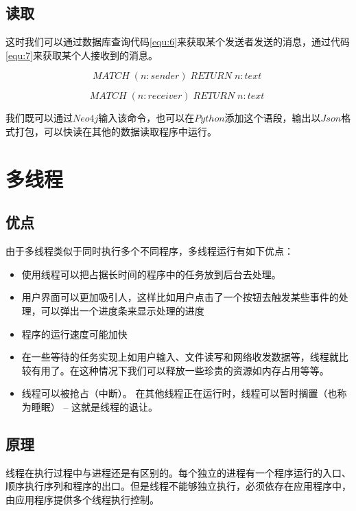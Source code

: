 \documentclass[forprint]{sql}
\begin{document}
\subsection{读取}
这时我们可以通过数据库查询代码\ref{equ:6}来获取某个发送者发送的消息，通过代码\ref{equ:7}来获取某个人接收到的消息。

\begin{equation}
	\label{equ:6}
	MATCH \; (n:sender) \; RETURN \; n:text \;
\end{equation}

\begin{equation}
	\label{equ:7}
	MATCH \; (n:receiver) \; RETURN \; n:text \;
\end{equation}

我们既可以通过$Neo4j$输入该命令，也可以在$Python$添加这个语段，输出以$Json$格式打包，可以快读在其他的数据读取程序中运行。

\section{多线程}
\subsection{优点}

由于多线程类似于同时执行多个不同程序，多线程运行有如下优点：

\begin{itemize}
	\item 使用线程可以把占据长时间的程序中的任务放到后台去处理。
	\item 用户界面可以更加吸引人，这样比如用户点击了一个按钮去触发某些事件的处理，可以弹出一个进度条来显示处理的进度
	\item 程序的运行速度可能加快
	\item 在一些等待的任务实现上如用户输入、文件读写和网络收发数据等，线程就比较有用了。在这种情况下我们可以释放一些珍贵的资源如内存占用等等。
	\item 线程可以被抢占（中断）。
	在其他线程正在运行时，线程可以暂时搁置（也称为睡眠） -- 这就是线程的退让。
\end{itemize}

\subsection{原理}

线程在执行过程中与进程还是有区别的。每个独立的进程有一个程序运行的入口、顺序执行序列和程序的出口。但是线程不能够独立执行，必须依存在应用程序中，由应用程序提供多个线程执行控制。
\end{document}
